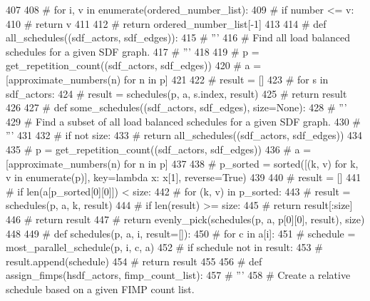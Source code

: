 \begin{DoxyCode}
{407 
408 \textcolor{comment}{#     for i, v in enumerate(ordered\_number\_list):}
409 \textcolor{comment}{#         if number <= v:}
410 \textcolor{comment}{#             return v}
411 
412 \textcolor{comment}{#     return ordered\_number\_list[-1]}
413 
414 \textcolor{comment}{# def all\_schedules((sdf\_actors, sdf\_edges)):}
415 \textcolor{comment}{#     '''}
416 \textcolor{comment}{#       Find all load balanced schedules for a given SDF graph.}
417 \textcolor{comment}{#     '''}
418 
419 \textcolor{comment}{#     p = get\_repetition\_count((sdf\_actors, sdf\_edges))}
420 \textcolor{comment}{#     a = [approximate\_numbers(n) for n in p]}
421 
422 \textcolor{comment}{#     result = []}
423 \textcolor{comment}{#     for s in sdf\_actors:}
424 \textcolor{comment}{#         result = schedules(p, a, s.index, result)}
425 \textcolor{comment}{#     return result}
426 
427 \textcolor{comment}{# def some\_schedules((sdf\_actors, sdf\_edges), size=None):}
428 \textcolor{comment}{#     '''}
429 \textcolor{comment}{#       Find a subset of all load balanced schedules for a given SDF graph.}
430 \textcolor{comment}{#     '''}
431 
432 \textcolor{comment}{#     if not size:}
433 \textcolor{comment}{#         return all\_schedules((sdf\_actors, sdf\_edges))}
434 
435 \textcolor{comment}{#     p = get\_repetition\_count((sdf\_actors, sdf\_edges))}
436 \textcolor{comment}{#     a = [approximate\_numbers(n) for n in p]}
437 
438 \textcolor{comment}{#     p\_sorted = sorted([(k, v) for k, v in enumerate(p)], key=lambda x: x[1], reverse=True)}
439 
440 \textcolor{comment}{#     result = []}
441 \textcolor{comment}{#     if len(a[p\_sorted[0][0]]) < size:}
442 \textcolor{comment}{#         for (k, v) in p\_sorted:}
443 \textcolor{comment}{#             result = schedules(p, a, k, result)}
444 \textcolor{comment}{#             if len(result) >= size:}
445 \textcolor{comment}{#                 return result[:size]}
446 \textcolor{comment}{#         return result}
447 \textcolor{comment}{#     return evenly\_pick(schedules(p, a, p[0][0], result), size)}
448 
449 \textcolor{comment}{# def schedules(p, a, i, result=[]):}
450 \textcolor{comment}{#     for c in a[i]:}
451 \textcolor{comment}{#         schedule = most\_parallel\_schedule(p, i, c, a)}
452 \textcolor{comment}{#         if schedule not in result:}
453 \textcolor{comment}{#             result.append(schedule)}
454 \textcolor{comment}{#     return result}
455 
456 \textcolor{comment}{# def assign\_fimps(hsdf\_actors, fimp\_count\_list):}
457 \textcolor{comment}{#     '''}
458 \textcolor{comment}{#       Create a relative schedule based on a given FIMP count list.}
}
\end{DoxyCode}
